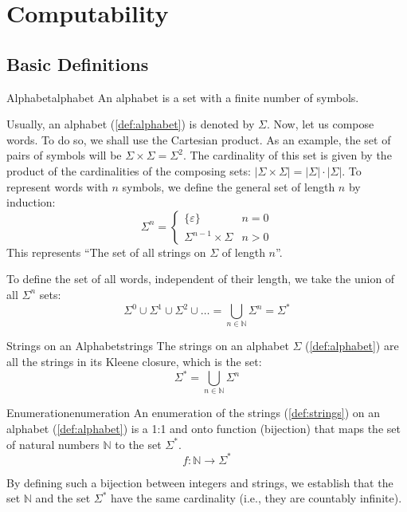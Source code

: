 \chapter{Computability}
\section{Basic Definitions}

\begin{definition}{Alphabet}{alphabet}
    An alphabet is a set with a finite number of symbols.
\end{definition}

\noindent Usually, an alphabet (\cref{def:alphabet}) is denoted by \(\Sigma\). Now, let us compose words. To do so, we shall use the Cartesian product. As an example, the set of pairs of symbols will be \(\Sigma\times\Sigma=\Sigma^2\). The cardinality of this set is given by the product of the cardinalities of the composing sets: \(|\Sigma\times\Sigma|=|\Sigma|\cdot|\Sigma|\). To represent words with \(n\) symbols, we define the general set of length \(n\) by induction:
\[
    \Sigma^n=\begin{cases}
        \{\varepsilon\} & n=0\\
        \Sigma^{n-1}\times \Sigma & n>0
    \end{cases}
\]
This represents ``The set of all strings on \(\Sigma\) of length \(n\)''.

\noindent To define the set of all words, independent of their length, we take the union of all \(\Sigma^n\) sets:
\[
    \Sigma^0 \cup\Sigma^1 \cup\Sigma^2 \cup\ldots=\bigcup_{n\in\mathbb{N}}\Sigma^n=\Sigma^*
\]

\begin{definition}{Strings on an Alphabet}{strings}
    The strings on an alphabet \(\Sigma\) (\cref{def:alphabet}) are all the strings in its Kleene closure, which is the set:
    \[\Sigma^*=\bigcup_{n\in\mathbb{N}}\Sigma^n\]
\end{definition}

\begin{definition}{Enumeration}{enumeration}
    An enumeration of the strings (\cref{def:strings}) on an alphabet (\cref{def:alphabet}) is a 1:1 and onto function (bijection) that maps the set of natural numbers \(\mathbb{N}\) to the set \(\Sigma^*\).
    \[
        f:\mathbb{N}\rightarrow \Sigma^*
    \]
\end{definition}

\noindent By defining such a bijection between integers and strings, we establish that the set \(\mathbb{N}\) and the set \(\Sigma^*\) have the same cardinality (i.e., they are countably infinite).

